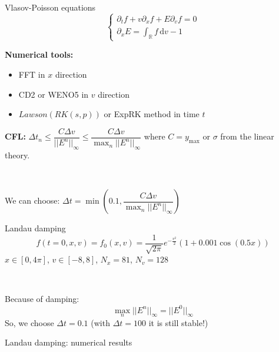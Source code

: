 \documentclass{beamer}
\newcommand{\mbold}[1]{\textbf{\color{mblue}#1}}
\begin{document}
\begin{frame}{Vlasov-Poisson equations}
  $$
    \begin{cases}
      \partial_tf + v\partial_xf + E\partial_vf = 0 \\
      \partial_xE = \int_{\mathbb{R}} f\,\mathrm{d}v - 1
    \end{cases}
  $$

  \mbold{Numerical tools:}
  \begin{itemize}
    \item FFT in $x$ direction
    \item CD2 or WENO5 in $v$ direction
    \item $Lawson(RK(s,p))$ or ExpRK method in time $t$
  \end{itemize}

  \mbold{CFL:} $\Delta t_n \leq \dfrac{C\Delta v}{||E^n||_{\infty}} \leq \dfrac{C\Delta v}{\max_n||E^n||_{\infty}}$ where $C = y_\text{max}$ or $\sigma$ from the linear theory.

  \ 

  We can choose: $\Delta t = \min\left( 0.1 , \dfrac{C\Delta v}{\max_n||E^n||_{\infty}} \right)$
\end{frame}
\begin{frame}{Landau damping}
  $$
    f(t=0,x,v) = f_0(x,v) = \frac{1}{\sqrt{2\pi}}e^{-\frac{v^2}{2}}(1+0.001\cos(0.5x))
  $$
  $x\in[0,4\pi]$, $v\in[-8,8]$, $N_x = 81$, $N_v=128$

  \ 

  Because of damping:
  $$
    \max_n||E^n||_{\infty} = ||E^0||_\infty
  $$
  So, we choose $\Delta t = 0.1$ (with $\Delta t = 100$ it is still stable!)
\end{frame}
\begin{frame}{Landau damping: numerical results}
\end{frame}
\end{document}
